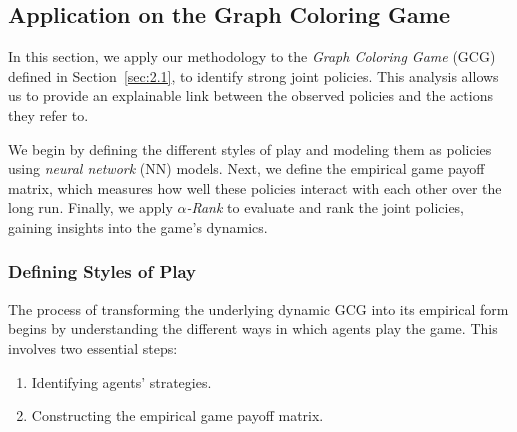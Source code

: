 \subsection{Application on the Graph Coloring Game}

    In this section, we apply our methodology to the \emph{Graph Coloring Game} (GCG) defined in Section~\ref{sec:2.1}, to identify strong joint policies. This analysis allows us to provide an explainable link between the observed policies and the actions they refer to.\tinydouble

    \noindent
    We begin by defining the different styles of play and modeling them as policies using \emph{neural network} (NN) models. Next, we define the empirical game payoff matrix, which measures how well these policies interact with each other over the long run. Finally, we apply \emph{$\alpha$-Rank} to evaluate and rank the joint policies, gaining insights into the game's dynamics.

    \subsubsection{Defining Styles of Play}
    \label{sec:5.1}

        The process of transforming the underlying dynamic GCG into its empirical form begins by understanding the different ways in which agents play the game. This involves two essential steps:
        \begin{enumerate}
            \item Identifying agents' strategies.
            \item Constructing the empirical game payoff matrix.
        \end{enumerate}

